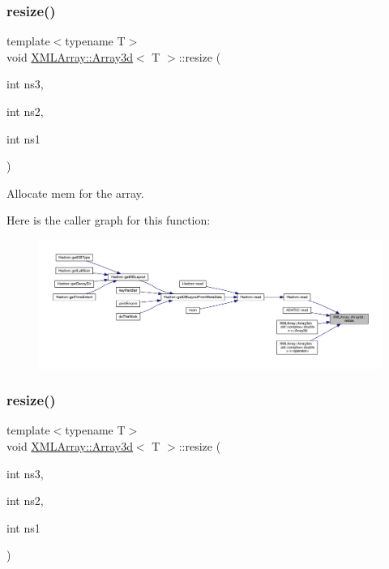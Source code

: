 \subsubsection{\texorpdfstring{resize()}{resize()}\hspace{0.1cm}{\footnotesize\ttfamily [1/3]}}
{\footnotesize\ttfamily template$<$typename T$>$ \\
void \mbox{\hyperlink{classXMLArray_1_1Array3d}{X\+M\+L\+Array\+::\+Array3d}}$<$ T $>$\+::resize (\begin{DoxyParamCaption}\item[{int}]{ns3,  }\item[{int}]{ns2,  }\item[{int}]{ns1 }\end{DoxyParamCaption})\hspace{0.3cm}{\ttfamily [inline]}}



Allocate mem for the array. 

Here is the caller graph for this function\+:
\nopagebreak
\begin{figure}[H]
\begin{center}
\leavevmode
\includegraphics[width=350pt]{db/da0/classXMLArray_1_1Array3d_afe27b06ef40efdd87dbea00eafa35287_icgraph}
\end{center}
\end{figure}
\mbox{\label{classXMLArray_1_1Array3d_afe27b06ef40efdd87dbea00eafa35287}} 
\subsubsection{\texorpdfstring{resize()}{resize()}\hspace{0.1cm}{\footnotesize\ttfamily [2/3]}}
{\footnotesize\ttfamily template$<$typename T$>$ \\
void \mbox{\hyperlink{classXMLArray_1_1Array3d}{X\+M\+L\+Array\+::\+Array3d}}$<$ T $>$\+::resize (\begin{DoxyParamCaption}\item[{int}]{ns3,  }\item[{int}]{ns2,  }\item[{int}]{ns1 }\end{DoxyParamCaption})\hspace{0.3cm}{\ttfamily [inline]}}



